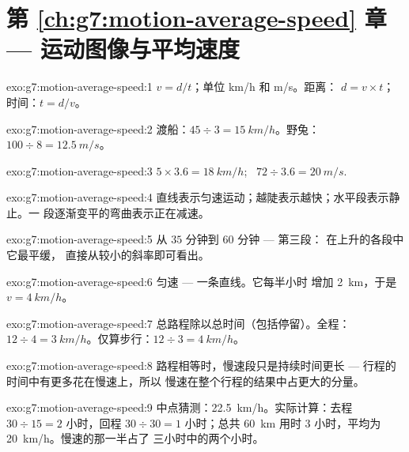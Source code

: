\section*{第 \ref{ch:g7:motion-average-speed} 章 --- 运动图像与平均速度}

\begin{solution}{exo:g7:motion-average-speed:1}
$v = d/t$；单位 \unit{km/h} 和 \unit{m/s}。距离：
$d = v \times t$；时间：$t = d/v$。
\end{solution}

\begin{solution}{exo:g7:motion-average-speed:2}
渡船：$45 \div 3 = \qty{15}{km/h}$。野兔：$100 \div 8 =
\qty{12.5}{m/s}$。
\end{solution}

\begin{solution}{exo:g7:motion-average-speed:3}
$5 \times 3.6 = \qty{18}{km/h}$; \ $72 \div 3.6 = \qty{20}{m/s}$.
\end{solution}

\begin{solution}{exo:g7:motion-average-speed:4}
直线表示匀速运动；越陡表示越快；水平段表示静止。一
段逐渐变平的弯曲表示正在减速。
\end{solution}

\begin{solution}{exo:g7:motion-average-speed:5}
从 $35$ 分钟到 $60$ 分钟 --- 第三段：
在上升的各段中它最平缓，
直接从较小的斜率即可看出。
\end{solution}

\begin{solution}{exo:g7:motion-average-speed:6}
匀速 --- 一条直线。它每半小时
增加 \qty{2}{km}，于是 $v = \qty{4}{km/h}$。
\end{solution}

\begin{solution}{exo:g7:motion-average-speed:7}
总路程除以总时间（包括停留）。全程：
$12 \div 4 = \qty{3}{km/h}$。仅算步行：$12 \div 3 =
\qty{4}{km/h}$。
\end{solution}

\begin{solution}{exo:g7:motion-average-speed:8}
路程相等时，慢速段只是持续时间更长 ---
行程的时间中有更多花在慢速上，所以
慢速在整个行程的结果中占更大的分量。
\end{solution}

\begin{solution}{exo:g7:motion-average-speed:9}
中点猜测：\qty{22.5}{km/h}。实际计算：去程 $30 \div 15 = 2$
小时，回程 $30 \div 30 = 1$ 小时；总共 \qty{60}{km} 用时 $3$
小时，平均为 \qty{20}{km/h}。慢速的那一半占了
三小时中的两个小时。
\end{solution}

